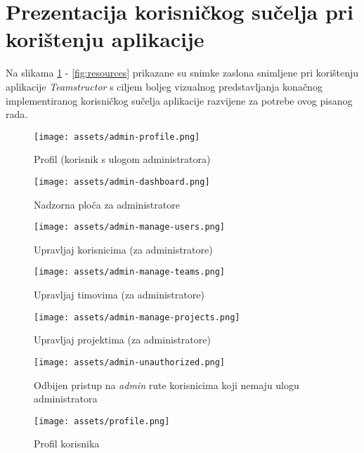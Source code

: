 \section{Prezentacija korisničkog sučelja pri korištenju aplikacije}
Na slikama \ref{fig:adminProfile} - \ref{fig:resources} prikazane su snimke zaslona snimljene pri korištenju aplikacije \textit{Teamstructor} s ciljem boljeg vizualnog predstavljanja konačnog implementiranog korisničkog sučelja aplikacije razvijene za potrebe ovog pisanog rada.

\begin{figure}[H]
	\texttt{[image: assets/admin-profile.png]}
	\centering
	\caption{Profil (korisnik s ulogom administratora)}
	\label{fig:adminProfile}
\end{figure}

\begin{figure}[H]
	\texttt{[image: assets/admin-dashboard.png]}
	\centering
	\caption{Nadzorna ploča za administratore}	\label{fig:adminDashboard}
\end{figure}

\begin{figure}[H]
	\texttt{[image: assets/admin-manage-users.png]}
	\centering
	\caption{Upravljaj korisnicima (za administratore)}
	\label{fig:manageUsers}
\end{figure}

\begin{figure}[H]
	\texttt{[image: assets/admin-manage-teams.png]}
	\centering
	\caption{Upravljaj timovima (za administratore)}
	\label{fig:manageTeams}
\end{figure}

\begin{figure}[H]
	\texttt{[image: assets/admin-manage-projects.png]}
	\centering
	\caption{Upravljaj projektima (za administratore)}
	\label{fig:manageProjects}
\end{figure}

\begin{figure}[H]
	\texttt{[image: assets/admin-unauthorized.png]}
	\centering
	\caption{Odbijen pristup na \textit{admin} rute korisnicima koji nemaju ulogu administratora}
	\label{fig:adminUnauthorized}
\end{figure}

\begin{figure}[H]
	\texttt{[image: assets/profile.png]}
	\centering
	\caption{Profil korisnika}
	\label{fig:profile}
\end{figure}

